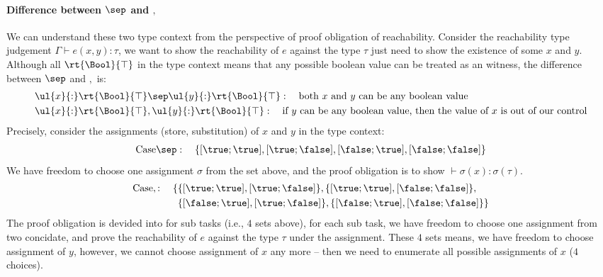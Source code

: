\paragraph{Difference between $\sep$ and $,$}
We can understand these two type context from the perspective of proof obligation of reachability. Consider the reachability type judgement $\Gamma \vdash e(x, y) : \tau$, we want to show the reachability of $e$ against the type $\tau$ just need to show the existence of some $x$ and $y$. Although all $\rt{\Bool}{\top}$ in the type context means that any possible boolean value can be treated as an witness, the difference between $\sep$ and $,$ is:
\begin{align*}
    &\ul{x}{:}\rt{\Bool}{\top} \sep \ul{y}{:}\rt{\Bool}{\top} : \quad \text{both $x$ and $y$ can be any boolean value}
    \\ &\ul{x}{:}\rt{\Bool}{\top}, \ul{y}{:}\rt{\Bool}{\top} : \quad \text{if $y$ can be any boolean value, then the value of $x$ is out of our control}
\end{align*}\noindent
Precisely, consider the assignments (store, substitution) of $x$ and $y$ in the type context:
\begin{align*}
    \text{Case}\sep : \quad \{[\true; \true], [\true; \false], [\false; \true], [\false; \false]\}
\end{align*}\noindent
We have freedom to choose one assignment $\sigma$ from the set above, and the proof obligation is to show $\vdash \sigma(x): \sigma(\tau)$.
\begin{align*}
    \text{Case}, : \quad \{&\{[\true; \true], [\true; \false]\}, \{[\true; \true], [\false; \false]\}, 
    \\&\{[\false; \true], [\true; \false]\}, \{[\false; \true], [\false; \false]\}\}
\end{align*}\noindent
The proof obligation is devided into for sub tasks (i.e., $4$ sets above), for each sub task, we have freedom to choose one assignment from two concidate, and prove the reachability of $e$ against the type $\tau$ under the assignment. These $4$ sets means, we have freedom to choose assignment of $y$, however, we cannot choose assignment of $x$ any more -- then we need to enumerate all possible assignments of $x$ ($4$ choices).

